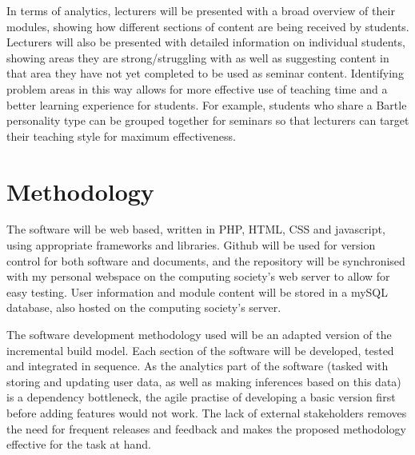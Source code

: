\documentclass{report}
\begin{document}
In terms of analytics, lecturers will be presented with a broad overview of their modules, showing how different sections of content are being received by students. Lecturers will also be presented with detailed information on individual students, showing areas they are strong/struggling with as well as suggesting content in that area they have not yet completed to be used as seminar content. Identifying problem areas in this way allows for more effective use of teaching time and a better learning experience for students. For example, students who share a Bartle personality type can be grouped together for seminars so that lecturers can target their teaching style for maximum effectiveness.
\section*{Methodology}
The software will be web based, written in PHP, HTML, CSS and javascript, using appropriate frameworks and libraries. Github will be used for version control for both software and documents, and the repository will be synchronised with my personal webspace on the computing society's web server to allow for easy testing. User information and module content will be stored in a mySQL database, also hosted on the computing society's server.

The software development methodology used will be an adapted version of the incremental build model. Each section of the software will be developed, tested and integrated in sequence.  As the analytics part of the software (tasked with storing and updating user data, as well as making inferences based on this data) is a dependency bottleneck, the agile practise of developing a basic version first before adding features would not work. The lack of external stakeholders removes the need for frequent releases and feedback and makes the proposed methodology effective for the task at hand.
\end{document}
